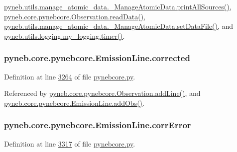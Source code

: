 \hyperlink{manage__atomic__data_8py_source_l00431}{pyneb.\+utils.\+manage\+\_\+atomic\+\_\+data.\+\_\+\+Manage\+Atomic\+Data.\+print\+All\+Sources()}, \hyperlink{pynebcore_8py_source_l03589}{pyneb.\+core.\+pynebcore.\+Observation.\+read\+Data()}, \hyperlink{manage__atomic__data_8py_source_l00380}{pyneb.\+utils.\+manage\+\_\+atomic\+\_\+data.\+\_\+\+Manage\+Atomic\+Data.\+set\+Data\+File()}, and \hyperlink{logging_8py_source_l00115}{pyneb.\+utils.\+logging.\+my\+\_\+logging.\+timer()}.

\hypertarget{classpyneb_1_1core_1_1pynebcore_1_1_emission_line_a5af607e131b5677bff4589562605fe26}{}
\subsubsection[{corrected}]{\setlength{\rightskip}{0pt plus 5cm}pyneb.\+core.\+pynebcore.\+Emission\+Line.\+corrected}\label{classpyneb_1_1core_1_1pynebcore_1_1_emission_line_a5af607e131b5677bff4589562605fe26}


Definition at line \hyperlink{pynebcore_8py_source_l03264}{3264} of file \hyperlink{pynebcore_8py_source}{pynebcore.\+py}.



Referenced by \hyperlink{pynebcore_8py_source_l03436}{pyneb.\+core.\+pynebcore.\+Observation.\+add\+Line()}, and \hyperlink{pynebcore_8py_source_l03347}{pyneb.\+core.\+pynebcore.\+Emission\+Line.\+add\+Obs()}.

\hypertarget{classpyneb_1_1core_1_1pynebcore_1_1_emission_line_adc12988469a310bf5ecaabf299669fc1}{}
\subsubsection[{corr\+Error}]{\setlength{\rightskip}{0pt plus 5cm}pyneb.\+core.\+pynebcore.\+Emission\+Line.\+corr\+Error}\label{classpyneb_1_1core_1_1pynebcore_1_1_emission_line_adc12988469a310bf5ecaabf299669fc1}


Definition at line \hyperlink{pynebcore_8py_source_l03317}{3317} of file \hyperlink{pynebcore_8py_source}{pynebcore.\+py}.



